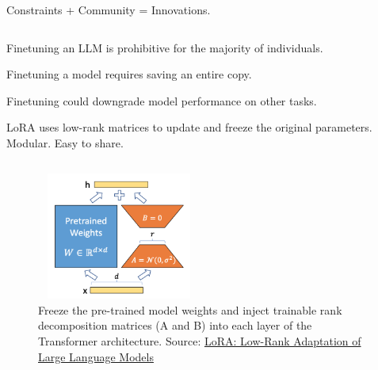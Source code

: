 \documentclass[9pt]{beamer}
\begin{document}
\begin{frame}{Constraints + Community = Innovations.}
    \begin{column}{0.50\textwidth}
        \begin{itemsize}
            \item Finetuning an LLM is prohibitive for the majority of individuals.
            \vspace{0.1cm}
            \item Finetuning a model requires saving an entire copy.
            \vspace{0.1cm}
            \item Finetuning could downgrade model performance on other tasks.
            \vspace{0.1cm}
            \item LoRA uses low-rank matrices to update and freeze the original parameters. Modular. Easy to share.
        \end{itemsize}
    \end{column}
    \begin{column}{0.50\textwidth}
        \begin{figure}
            \centering
            \includegraphics[width = 5.4cm, height=4.2cm]{img/lora-finetuning.png}
            \caption{Freeze the pre-trained model weights and inject trainable rank decomposition matrices (A and B) into each layer of the Transformer architecture. Source: \href{phttps://arxiv.org/pdf/2106.09685.pdf}{LoRA: Low-Rank Adaptation of Large Language Models}}
            \label{fig:enter-label}
        \end{figure}
    \end{column}
\end{frame}
\end{document}

